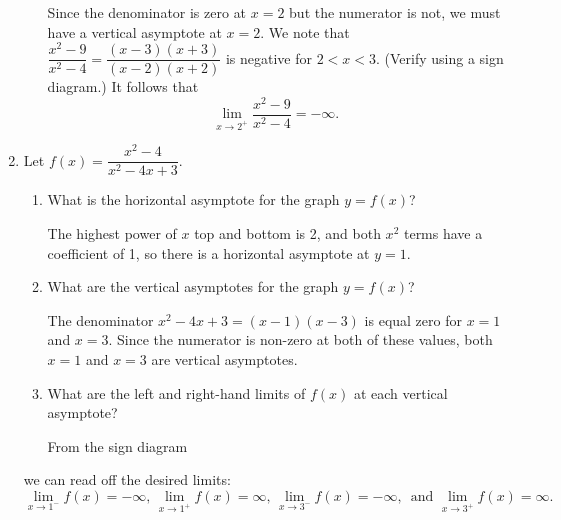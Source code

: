 \documentclass[12pt]{article}
\begin{document}
\begin{enumerate}
\begin{enumerate}
\medskip

Since the denominator is zero at $x=2$ but the numerator is not, we must have a vertical asymptote at $x=2$. We note that $\dfrac{x^2-9}{x^2-4} = \dfrac{(x-3)(x+3)}{(x-2)(x+2)}$ is negative for $2<x<3$. (Verify using a sign diagram.) It follows that
\[
 \lim_{x\to 2^+}\frac{x^2-9}{x^2-4} = -\infty.
\]

\end{enumerate}

\newpage

 \item Let $f(x) = \dfrac{x^2-4}{x^2-4x+3}$.
\begin{enumerate}
 \item What is the horizontal asymptote for the graph $y=f(x)$?

\medskip

The highest power of $x$ top and bottom is 2, and both $x^2$ terms have a coefficient of 1, so there is a horizontal asymptote at $y=1$.

\medskip

 \item What are the vertical asymptotes for the graph $y=f(x)$?

\medskip

The denominator $x^2-4x+3 = (x-1)(x-3)$ is equal zero for $x=1$ and $x=3$. Since the numerator is non-zero at both of these values, both $x=1$ and $x=3$ are vertical asymptotes.

\medskip

 \item What are the left and right-hand limits of $f(x)$ at each vertical asymptote?

From the sign diagram
\begin{center}
\end{center}
\end{enumerate}
we can read off the desired limits:
\[
 \lim_{x\to 1^-}f(x) = -\infty,\, \lim_{x\to 1^+}f(x) = \infty,\, \lim_{x\to 3^-}f(x) = -\infty,\,\text{ and } \lim_{x\to 3^+}f(x) = \infty.
\]





\end{enumerate}
\end{document}
